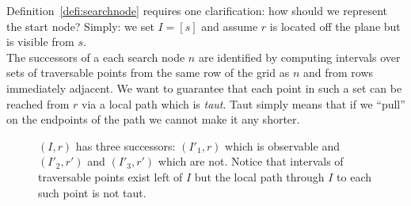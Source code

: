Definition~\ref{defi:searchnode} requires one clarification: how 
should we represent the start node? Simply: we set $I = [s]$ and 
assume $r$ is located off the plane but is visible from $s$. 
\\
The successors of a each search node $n$ are identified by computing intervals
over sets of traversable points from the same row of the grid as $n$ and from rows
immediately adjacent. We want to guarantee that each point in such
a set can be reached from $r$ via a local path which is \emph{taut}.
Taut simply means that if we ``pull'' on the endpoints of the path we cannot
make it any shorter.

\begin{figure}[tb]
  \begin{center}
    
  \end{center}
  \caption{$(I, r)$ has three successors: $(I'_1, r)$ which is observable
and $(I'_2, r')$ and $(I'_3, r')$ which are not. Notice that intervals of traversable
points exist left of $I$ but the local path through $I$ to each such point is
not taut.}
\label{fig::successors}
\end{figure}

